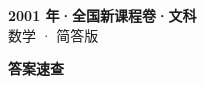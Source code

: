 \documentclass[zihao=-4, a4paper]{ctexart}
\begin{document}
\begin{center}
  {\Large\bfseries 2001 年·全国新课程卷·文科}\\[4pt]
  {\large 数学 · 简答版}
\end{center}
\medskip
{}

\clearpage
{}
\begin{center}{\Large\bfseries 答案速查}\end{center}
\medskip

\end{document}
